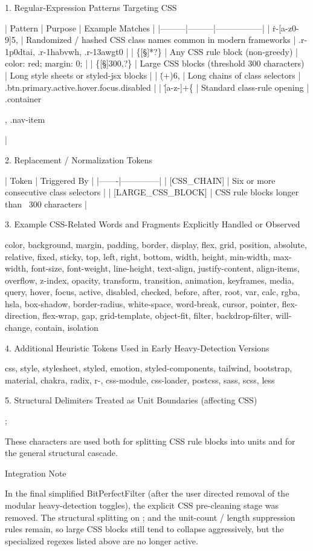 1. Regular-Expression Patterns Targeting CSS

| Pattern | Purpose | Example Matches |
|---------|---------|-----------------|
| \.r-[a-z0-9]{5,} | Randomized / hashed CSS class names common in modern frameworks | .r-1p0dtai, .r-1habvwh, .r-13awgt0 |
| \{[\s\S]*?\} | Any CSS rule block (non-greedy) | { color: red; margin: 0; } |
| \{[\s\S]{300,}?\} | Large CSS blocks (threshold 300 characters) | Long style sheets or styled-jsx blocks |
| (\.\w+){6,} | Long chains of class selectors | .btn.primary.active.hover.focus.disabled |
| \.[a-z-]+\s*\{ | Standard class-rule opening | .container {, .nav-item { |

2. Replacement / Normalization Tokens

| Token | Triggered By |
|-------|--------------|
| [CSS_CHAIN] | Six or more consecutive class selectors |
| [LARGE_CSS_BLOCK] | CSS rule blocks longer than ~300 characters |

3. Example CSS-Related Words and Fragments Explicitly Handled or Observed

color, background, margin, padding, border, display, flex, grid,
position, absolute, relative, fixed, sticky, top, left, right, bottom,
width, height, min-width, max-width, font-size, font-weight, line-height,
text-align, justify-content, align-items, overflow, z-index, opacity,
transform, transition, animation, keyframes, media, query, hover, focus,
active, disabled, checked, before, after, root, var, calc, rgba, hsla,
box-shadow, border-radius, white-space, word-break, cursor, pointer,
flex-direction, flex-wrap, gap, grid-template, object-fit, filter,
backdrop-filter, will-change, contain, isolation

4. Additional Heuristic Tokens Used in Early Heavy-Detection Versions

css, style, stylesheet, styled, emotion, styled-components, 
tailwind, bootstrap, material, chakra, radix, 
r-, css-module, css-loader, postcss, sass, scss, less

5. Structural Delimiters Treated as Unit Boundaries (affecting CSS)

{   }   ;   \n

These characters are used both for splitting CSS rule blocks into units and for the general structural cascade.

Integration Note

In the final simplified BitPerfectFilter (after the user directed removal of the modular heavy-detection toggles), the explicit CSS pre-cleaning stage was removed. The structural splitting on { } ; \n and the unit-count / length suppression rules remain, so large CSS blocks still tend to collapse aggressively, but the specialized regexes listed above are no longer active.

}}
